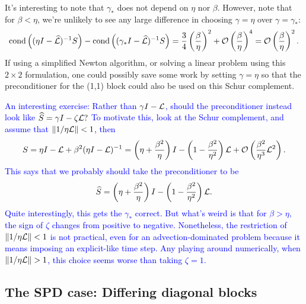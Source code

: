 \documentclass[a4paper,10pt]{article}
\newcommand{\tcb}{\textcolor{blue}}
\begin{document}
{It's interesting to note that $\gamma_*$ does not depend on $\eta$ nor $\beta$. However, note that for $\beta < \eta$, we're unlikely to see any large difference in choosing $\gamma = \eta$ over $\gamma = \gamma_*$:
\begin{align}
\textnormal{cond}\left((\eta I- \widehat{\mathcal{L}})^{-1}S\right)
-
\textnormal{cond}\left((\gamma_* I- \widehat{\mathcal{L}})^{-1}S\right)
=
\frac{3}{4} \left( \frac{\beta}{\eta} \right)^2 + {\cal O}\left( \frac{\beta}{\eta} \right)^4 = {\cal O} \left( \frac{\beta}{\eta} \right)^2.
\end{align}
If using a simplified Newton algorithm, or solving a linear problem using this $2 \times 2$ formulation, one could possibly save some work by setting $\gamma = \eta$ so that the preconditioner for the (1,1) block could also be used on this Schur complement.

\newpage
\tcb{An interesting exercise: Rather than $\gamma I - {\cal L}$, should the preconditioner instead look like $\widehat{S} = \gamma I - \zeta {\cal L}?$ To motivate this, look at the Schur complement, and assume that $\Vert 1/\eta {\cal L} \Vert < 1$, then
\begin{align}
S = \eta I - {\cal L}  + \beta^2 (\eta I - {\cal L})^{-1} = \left( \eta + \frac{\beta^2}{\eta} \right) I - \left(1 - \frac{\beta^2}{\eta^2} \right) {\cal L} + {\cal O}\left( \frac{\beta^2}{\eta^3} {\cal L}^2 \right).
\end{align}
This says that we probably should take the preconditioner to be
\begin{align}
\widehat{S} = \left( \eta + \frac{\beta^2}{\eta} \right) I - \left(1 - \frac{\beta^2}{\eta^2} \right) {\cal L}.
\end{align}
Quite interestingly, this gets the $\gamma_*$ correct. But what's weird is that for $\beta > \eta$, the sign of $\zeta$ changes from positive to negative. Nonetheless, the restriction of $\Vert 1/\eta {\cal L} \Vert < 1$ is not practical, even for an advection-dominated problem because it means imposing an explicit-like time step. Any playing around numerically, when $\Vert 1/\eta {\cal L} \Vert > 1$, this choice seems worse than taking $\zeta = 1$.
}

\newpage
\subsection{The SPD case: Differing diagonal blocks}

}
\end{document}

